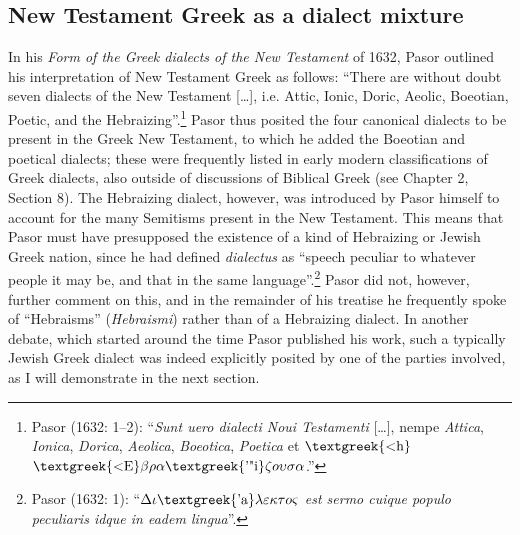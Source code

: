 \subsection{New Testament Greek as a dialect mixture}
\hypertarget{Toc19704831}{}\begin{styleStandard}
In his \textit{Form of the Greek dialects of the New Testament} of 1632, Pasor outlined his interpretation of New Testament Greek as follows: “There are without doubt seven dialects of the New Testament […], i.e. Attic, Ionic, Doric, Aeolic, Boeotian, Poetic, and the Hebraizing”.\footnote{ Pasor (1632: 1–2): “\textit{Sunt uero dialecti Noui Testamenti} […], nempe \textit{Attica}, \textit{Ionica}, \textit{Dorica}, \textit{Aeolica}, \textit{Boeotica}, \textit{Poetica} et $\text{\textgreek{<h}}$ $\text{\textgreek{<E}}\beta \rho \alpha \text{\textgreek{'"i}}\zeta o\upsilon \sigma \alpha $.”} Pasor thus posited the four canonical dialects to be present in the Greek New Testament, to which he added the Boeotian and poetical dialects; these were frequently listed in early modern classifications of Greek dialects, also outside of discussions of Biblical Greek (see Chapter 2, Section 8). The Hebraizing dialect, however, was introduced by Pasor himself to account for the many Semitisms present in the New Testament. This means that Pasor must have presupposed the existence of a kind of Hebraizing or Jewish Greek nation, since he had defined \textit{dialectus} as “speech peculiar to whatever people it may be, and that in the same language”.\footnote{ Pasor (1632: 1): “$\Delta \iota \text{\textgreek{'a}}\lambda \varepsilon \kappa \tau o\varsigma $ \textit{est sermo cuique populo peculiaris idque in eadem lingua}”.} Pasor did not, however, further comment on this, and in the remainder of his treatise he frequently spoke of “Hebraisms” (\textit{Hebraismi}) rather than of a Hebraizing dialect. In another debate, which started around the time Pasor published his work, such a typically Jewish Greek dialect was indeed explicitly posited by one of the parties involved, as I will demonstrate in the next section.
\end{styleStandard}

